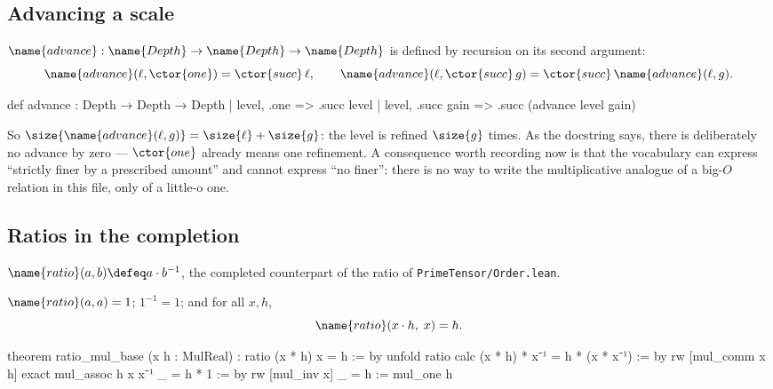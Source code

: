 \subsection{Advancing a scale}

\begin{definition}\label{Analysis:Derivative:def:advance}
$\name{advance} : \name{Depth} \to \name{Depth} \to \name{Depth}$ is defined by
recursion on its second argument:
\[
  \name{advance}(\ell, \ctor{one}) = \ctor{succ}\,\ell,
  \qquad
  \name{advance}(\ell, \ctor{succ}\,g) = \ctor{succ}\,\name{advance}(\ell, g).
\]
\end{definition}

\begin{leancode}
def advance : Depth → Depth → Depth
  | level, .one => .succ level
  | level, .succ gain => .succ (advance level gain)
\end{leancode}

So $\size{\name{advance}(\ell,g)} = \size{\ell} + \size{g}$: the level is
refined $\size{g}$ times.  As the docstring says, there is deliberately no
advance by zero --- $\ctor{one}$ already means one refinement.  A consequence
worth recording now is that the vocabulary can express ``strictly finer by a
prescribed amount'' and cannot express ``no finer'': there is no way to write
the multiplicative analogue of a big-$O$ relation in this file, only of a
little-o one.

\subsection{Ratios in the completion}

\begin{definition}\label{Analysis:Derivative:def:ratio}
$\name{ratio}(a,b) \defeq a \cdot b^{-1}$, the completed counterpart of the
ratio of \texttt{PrimeTensor/Order.lean}.
\end{definition}

\begin{lemma}\label{Analysis:Derivative:lem:ratio}
$\name{ratio}(a,a) = 1$; $1^{-1} = 1$; and for all $x, h$,
\[
  \name{ratio}(x \cdot h,\; x) = h .
\]
\end{lemma}

\begin{leancode}
theorem ratio_mul_base (x h : MulReal) :
    ratio (x * h) x = h := by
  unfold ratio
  calc
    (x * h) * x⁻¹
        = h * (x * x⁻¹) := by
          rw [mul_comm x h]
          exact mul_assoc h x x⁻¹
    _ = h * 1 := by rw [mul_inv x]
    _ = h := mul_one h
\end{leancode}

